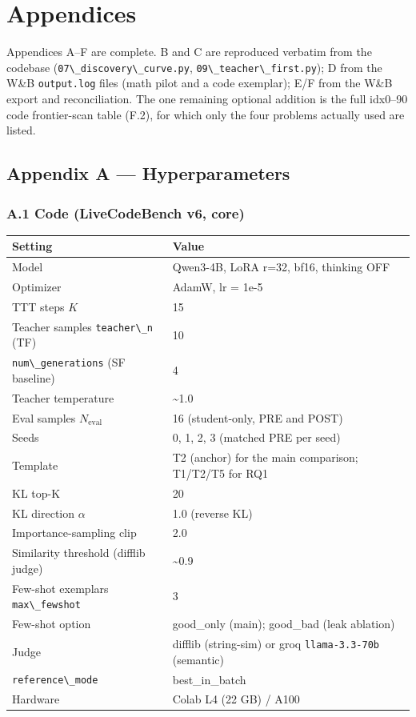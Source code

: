 \chapter{Appendices}\label{appendices}

Appendices A--F are complete. B and C are reproduced verbatim from the codebase (\passthrough{\lstinline!07\_discovery\_curve.py!}, \passthrough{\lstinline!09\_teacher\_first.py!}); D from the W\&B \passthrough{\lstinline!output.log!} files (math pilot and a code exemplar); E/F from the W\&B export and reconciliation. The one remaining optional addition is the full idx0--90 code frontier-scan table (F.2), for which only the four problems actually used are listed.

\section{Appendix A --- Hyperparameters}\label{appendix-a-hyperparameters}

\subsection{A.1 Code (LiveCodeBench v6, core)}\label{a.1-code-livecodebench-v6-core}

\begin{longtable}[]{@{}ll@{}}
\toprule\noalign{}
Setting & Value \\
\midrule\noalign{}
\endhead
\bottomrule\noalign{}
\endlastfoot
Model & Qwen3-4B, LoRA r=32, bf16, thinking OFF \\
Optimizer & AdamW, lr = 1e-5 \\
TTT steps \(K\) & 15 \\
Teacher samples \passthrough{\lstinline!teacher\_n!} (TF) & 10 \\
\passthrough{\lstinline!num\_generations!} (SF baseline) & 4 \\
Teacher temperature & \textasciitilde1.0 \\
Eval samples \(N_{\text{eval}}\) & 16 (student-only, PRE and POST) \\
Seeds & 0, 1, 2, 3 (matched PRE per seed) \\
Template & T2 (anchor) for the main comparison; T1/T2/T5 for RQ1 \\
KL top-K & 20 \\
KL direction \(\alpha\) & 1.0 (reverse KL) \\
Importance-sampling clip & 2.0 \\
Similarity threshold (difflib judge) & \textasciitilde0.9 \\
Few-shot exemplars \passthrough{\lstinline!max\_fewshot!} & 3 \\
Few-shot option & good\_only (main); good\_bad (leak ablation) \\
Judge & difflib (string-sim) or groq \passthrough{\lstinline!llama-3.3-70b!} (semantic) \\
\passthrough{\lstinline!reference\_mode!} & best\_in\_batch \\
Hardware & Colab L4 (22 GB) / A100 \\
\end{longtable}

